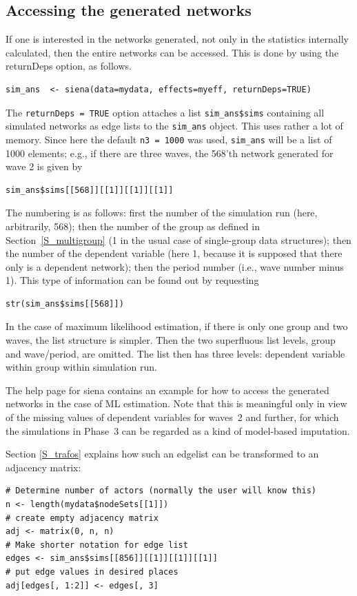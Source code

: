 \documentclass[a4paper,fleqn,11pt]{article}
\newcommand{\+}{\, + \,}
\begin{document}
\subsection{Accessing the generated networks}
\label{S_sims}

If one is interested in the networks generated, not only
in the statistics internally calculated,
then the entire networks can be accessed.
This is done by using the \textsf{returnDeps} option, as follows.
\begin{verbatim}
sim_ans  <- siena(data=mydata, effects=myeff, returnDeps=TRUE)
\end{verbatim}
The \texttt{returnDeps = TRUE} option attaches a list \texttt{sim\_ans\$sims}
containing all simulated networks
as edge lists to the \texttt{sim\_ans} object.
This uses rather a lot of memory.
Since here the default \texttt{n3 = 1000} was used, \texttt{sim\_ans} will be
a list of 1000 elements; e.g., if there are three waves, the 568'th network generated
for wave 2 is given by
\begin{verbatim}
sim_ans$sims[[568]][[1]][[1]][[1]]
\end{verbatim}
The numbering is as follows: first the number of the simulation run (here,
arbitrarily, 568); then the number of the group as defined in
Section~\ref{S_multigroup} (1 in the usual case of single-group data structures);
then the number of the dependent variable (here 1, because it is supposed
that there only is a dependent network);
then the period number (i.e., wave number minus 1).
This type of information can be found out by requesting
\begin{verbatim}
str(sim_ans$sims[[568]])
\end{verbatim}
\bigskip

In the case of maximum likelihood estimation,
if there is only one group and two waves, the list structure is simpler.
Then the two superfluous list levels, group and wave/period, are omitted.
The list then has three levels: dependent variable within group
within simulation run.
\bigskip

The help page for \textsf{siena} contains an example for how to access the
generated networks in the case of ML estimation. Note that this is meaningful only in view
of the missing values of dependent variables for waves~2 and further, for which the
simulations in Phase~3 can be regarded as a kind of model-based imputation.

Section \ref{S_trafos} explains how such an edgelist can be
transformed to an adjacency matrix:
\begin{verbatim}
# Determine number of actors (normally the user will know this)
n <- length(mydata$nodeSets[[1]])
# create empty adjacency matrix
adj <- matrix(0, n, n)
# Make shorter notation for edge list
edges <- sim_ans$sims[[856]][[1]][[1]][[1]]
# put edge values in desired places
adj[edges[, 1:2]] <- edges[, 3]
\end{verbatim}
\end{document}
